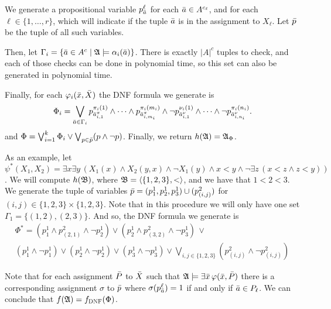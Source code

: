 \begin{enumerate}
	We generate a propositional variable $p^{\ell}_{\a}$ for each $\a\in A^{c_{\ell}}$, and for each $\ell\in\{1,\ldots,r\}$, which will indicate if the tuple $\a$ is in the assignment to $X_{\ell}$. Let $\p$ be the tuple of all such variables.
	
	Then, let $\Gamma_i = \{\a\in A^c\mid \A\models\alpha_i(\a)\}$. There is exactly $\vert A \vert^c$ tuples to check, and each of those checks can be done in polynomial time, so this set can also be generated in polynomial time.
	
	Finally, for each $\varphi_i(\x,\X)$ the DNF formula we generate is
	\[
	\Phi_i = \bigvee_{\a\in\Gamma_i} p^{\pi_i(1)}_{\a^{\pi}_{i,1}} \wedge \cdots \wedge p^{\pi_i(m_i)}_{\a^{\pi}_{i,m_i}} \wedge \neg p^{\nu_i(1)}_{\a^{\nu}_{i,1}} \wedge \cdots \wedge \neg p^{\pi_i(n_i)}_{\a^{\nu}_{i,n_i}}.
	\]
	and $\Phi = \bigvee_{i = 1}^k \Phi_i \vee \bigvee_{p\in\p} (p\wedge\neg p)$. Finally, we return $h(\A) = \A_{\Phi}$.
	
	As an example, let $\psi^{*}(X_1,X_2) = \exists x \exists y\, (X_1(x) \wedge X_2(y,x) \wedge \neg X_1(y) \wedge x < y \wedge \neg\exists z\,(x<z\wedge z<y))$. We will compute $h(\B)$, where $\B = \langle \{1,2,3\}, < \rangle$, and we have that $1 < 2 < 3$. We generate the tuple of variables $\p = (p^1_1,p^1_2,p^1_3) \cup (p^2_{(i,j)})$ for $(i,j)\in \{1,2,3\}\times\{1,2,3\}$. Note that in this procedure we will only have one set $\Gamma_1 = \{(1,2),(2,3)\}$. And so, the DNF formula we generate is 
	\begin{multline*}
	\Phi^{*} = (p^1_1\wedge p^2_{(2,1)} \wedge \neg p^1_2)\vee(p^1_2\wedge p^2_{(3,2)} \wedge \neg p^1_3)\, \vee \\ (p^1_1 \wedge \neg p^1_1) \vee(p^1_2 \wedge \neg p^1_2) \vee (p^1_3\wedge \neg p^1_3) \vee \bigvee_{i,j\in\{1,2,3\}}(p^2_{(i,j)}\wedge\neg p^2_{(i,j)})
	\end{multline*}
	
	Note that for each assignment $\P$ to $\X$ such that $\A\models\exists\x\,\varphi(\x,\P)$ there is a corresponding assignment $\sigma$ to $\p$ where $\sigma(p^{\ell}_{\a}) = 1$ if and only if $\a\in P_{\ell}$. We can conclude that $f(\A) = f_{\textsc{DNF}}(\Phi)$.
	

\end{enumerate}
